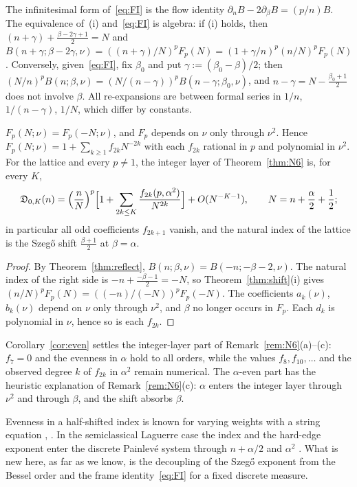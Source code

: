The infinitesimal form of~\eqref{eq:FI} is the flow identity $\partial_nB-2\partial_\beta B=(p/n)B$. The equivalence of~(i)
and~\eqref{eq:FI} is algebra: if (i) holds, then $(n+\gamma)+\frac{\beta-2\gamma+1}2=N$ and
$B(n+\gamma;\beta-2\gamma,\nu)=((n+\gamma)/N)^pF_p(N)=(1+\gamma/n)^p(n/N)^pF_p(N)$. Conversely, given~\eqref{eq:FI}, fix
$\beta_0$ and put $\gamma:=(\beta_0-\beta)/2$; then $(N/n)^pB(n;\beta,\nu)=(N/(n-\gamma))^pB(n-\gamma;\beta_0,\nu)$, and
$n-\gamma=N-\frac{\beta_0+1}2$ does not involve $\beta$. All re-expansions are between formal series in $1/n$, $1/(n-\gamma)$,
$1/N$, which differ by constants.

\begin{corollary}[evenness]\label{cor:even}
$F_p(N;\nu)=F_p(-N;\nu)$, and $F_p$ depends on $\nu$ only through $\nu^2$. Hence $F_p(N;\nu)=1+\sum_{k\ge1}f_{2k}N^{-2k}$ with
each $f_{2k}$ rational in $p$ and polynomial in $\nu^2$. For the lattice and every $p\ne1$, the integer layer of
Theorem~\ref{thm:N6} is, for every $K$,
\[
  \mathfrak D_{0,K}(n)=\Bigl(\frac nN\Bigr)^p\Bigl[1+\sum_{2k\le K}\frac{f_{2k}(p,\alpha^2)}{N^{2k}}\Bigr]+O(N^{-K-1}),\qquad N=n+\frac\alpha2+\frac12 ;
\]
in particular all odd coefficients $f_{2k+1}$ vanish, and the natural index of the lattice is the Szeg\H{o} shift $\frac{\beta+1}2$ at
$\beta=\alpha$.
\end{corollary}

\begin{proof}
By Theorem~\ref{thm:reflect}, $B(n;\beta,\nu)=B(-n;-\beta-2,\nu)$. The natural index of the right side is
$-n+\frac{-\beta-1}2=-N$, so Theorem~\ref{thm:shift}(i) gives $(n/N)^pF_p(N)=((-n)/(-N))^pF_p(-N)$. The coefficients $a_k(\nu)$,
$b_k(\nu)$ depend on $\nu$ only through $\nu^2$, and $\beta$ no longer occurs in $F_p$. Each $d_k$ is polynomial in $\nu$, hence
so is each $f_{2k}$.
\end{proof}

Corollary~\ref{cor:even} settles the integer-layer part of Remark~\ref{rem:N6}(a)--(c): $f_7=0$ and the evenness in $\alpha$ hold to
all orders, while the values $f_8,f_{10},\dots$ and the observed degree $k$ of $f_{2k}$ in $\alpha^2$ remain numerical. The $\alpha$-even
part has the heuristic explanation of Remark~\ref{rem:N6}(c): $\alpha$ enters the integer layer through $\nu^2$ and through $\beta$,
and the shift absorbs $\beta$.

Evenness in a half-shifted index is known for varying weights with a string equation \cite[Theorem~5.2]{BleherIts}, \cite{EMP,KuijlaarsTibboel}.
In the semiclassical Laguerre case the index and the hard-edge exponent enter the discrete Painlev\'e system through $n+\alpha/2$ and
$\alpha^2$ \cite[Theorem~2.1]{FilipukVanAsscheZhang}. What is new here, as far as we know, is the decoupling of the Szeg\H{o} exponent
from the Bessel order and the frame identity~\eqref{eq:FI} for a fixed discrete measure.

